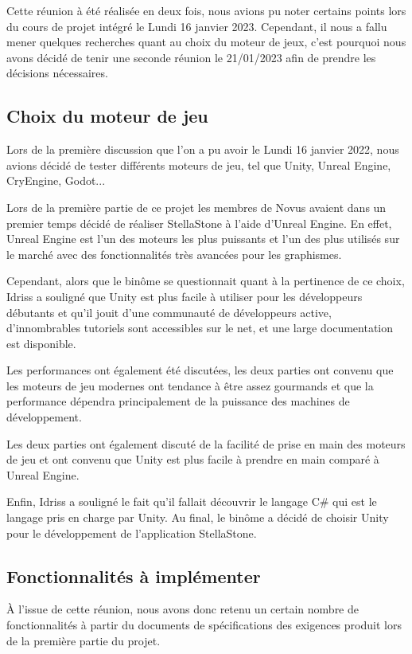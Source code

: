 \documentclass[a4paper, 12pt]{article}
\begin{document}
Cette réunion à été réalisée en deux fois, nous avions pu noter certains points lors du cours de projet intégré le Lundi 16 janvier 2023. 
Cependant, il nous a fallu mener quelques recherches quant au choix du moteur de jeux, c'est pourquoi nous avons décidé de tenir une seconde réunion le 21/01/2023 afin de prendre les décisions nécessaires. 


\subsection{Choix du moteur de jeu}

Lors de la première discussion que l'on a pu avoir le Lundi 16 janvier 2022, nous avions décidé de tester différents moteurs de jeu, tel que Unity, Unreal Engine, CryEngine, Godot...

Lors de la première partie de ce projet les membres de Novus avaient dans un premier temps décidé de réaliser StellaStone à l'aide d'Unreal Engine. En effet, Unreal Engine est l'un des moteurs les plus puissants et l'un des plus utilisés sur le marché avec des fonctionnalités très avancées pour les graphismes.

Cependant, alors que le binôme se questionnait quant à la pertinence de ce choix, Idriss a souligné que Unity est plus facile à utiliser pour les développeurs débutants et qu'il jouit d'une communauté de développeurs active, d'innombrables tutoriels sont accessibles sur le net, et une large documentation est disponible.

Les performances ont également été discutées, les deux parties ont convenu que les moteurs de jeu modernes ont tendance à être assez gourmands et que la performance dépendra principalement de la puissance des machines de développement.

Les deux parties ont également discuté de la facilité de prise en main des moteurs de jeu et ont convenu que Unity est plus facile à prendre en main comparé à Unreal Engine.

Enfin, Idriss a souligné le fait qu'il fallait découvrir le langage C\# qui est le langage pris en charge par Unity. Au final, le binôme a décidé de choisir Unity pour le développement de l'application StellaStone.


\subsection{Fonctionnalités à implémenter}

À l'issue de cette réunion, nous avons donc retenu un certain nombre de fonctionnalités à partir du documents de spécifications des exigences produit lors de la première partie du projet. 
\end{document}
